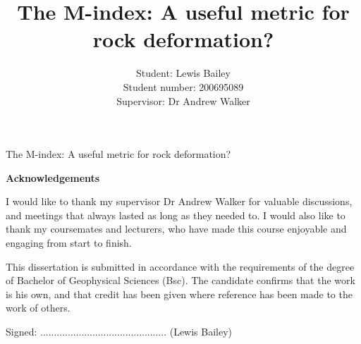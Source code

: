 \documentclass[a4paper,12pt,twoside]{report}
\title{\textbf{The M-index: A useful metric for rock deformation?}}
\author{Student: Lewis Bailey\\Student number: 200695089\\Supervisor: Dr Andrew Walker}
\date{}
\numberwithin{equation}{chapter}
\begin{document}

%
%
%
%
%
%


\vspace{3cm}
\begin{center}
{\huge The M-index: A useful metric for rock deformation?}
\vspace{3cm}

\begin{Large}
\textbf{Acknowledgements}
\end{Large}

I would like to thank my supervisor Dr Andrew Walker for valuable discussions, and meetings that always lasted as long as they needed to. I would also like to thank my coursemates and lecturers, who have made this course enjoyable and engaging from start to finish.
  
\vspace{3cm}
\noindent
\begin{Large}
\end{Large}

This dissertation is submitted in accordance with the requirements of the degree of Bachelor of Geophysical Sciences (Bsc). The candidate confirms that the work is his own, and that credit has been given where reference has been made to the work of others. 


\vspace{1cm}
\noindent
Signed: .............................................. (Lewis Bailey)

\end{center}
\tableofcontents
\listoffigures
\listoftables
\end{document}
